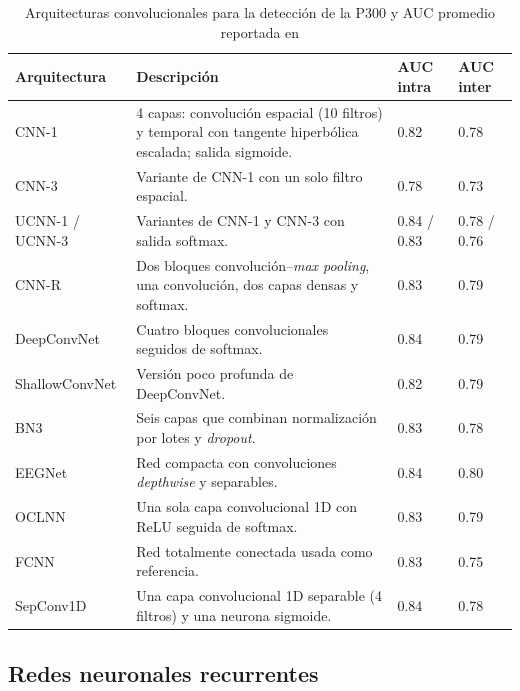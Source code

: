 \begin{table}[htbp]
\centering
\caption{Arquitecturas convolucionales para la detección de la P300 y AUC promedio reportada en
\cite{alvarado2021}}
\label{tab:arquitecturas}
\small
\begin{tabularx}{\textwidth}{L{2.8cm}YL{1.3cm}L{1.3cm}}
\toprule
\textbf{Arquitectura} & \textbf{Descripción} & \textbf{AUC intra} & \textbf{AUC inter} \\
\midrule
CNN-1 \cite{cecotti2011} & 4 capas: convolución espacial (10 filtros) y temporal con tangente hiperbólica escalada; salida sigmoide. & 0.82 & 0.78 \\
CNN-3 \cite{cecotti2011} & Variante de CNN-1 con un solo filtro espacial. & 0.78 & 0.73 \\
UCNN-1 / UCNN-3 \cite{alvarado2021} & Variantes de CNN-1 y CNN-3 con salida softmax. & 0.84 / 0.83 & 0.78 / 0.76 \\
CNN-R \cite{manor2015} & Dos bloques convolución--\textit{max pooling}, una convolución, dos capas densas y softmax. & 0.83 & 0.79 \\
DeepConvNet \cite{schirrmeister2017} & Cuatro bloques convolucionales seguidos de softmax. & 0.84 & 0.79 \\
ShallowConvNet \cite{schirrmeister2017} & Versión poco profunda de DeepConvNet. & 0.82 & 0.79 \\
BN3 \cite{liu2018} & Seis capas que combinan normalización por lotes y \textit{dropout}. & 0.83 & 0.78 \\
EEGNet \cite{lawhern2018} & Red compacta con convoluciones \textit{depthwise} y separables. & 0.84 & 0.80 \\
OCLNN \cite{shan2018} & Una sola capa convolucional 1D con ReLU seguida de softmax. & 0.83 & 0.79 \\
FCNN \cite{alvarado2021} & Red totalmente conectada usada como referencia. & 0.83 & 0.75 \\
SepConv1D \cite{alvarado2021} & Una capa convolucional 1D separable (4 filtros) y una neurona sigmoide. & 0.84 & 0.78 \\
\bottomrule
\end{tabularx}
\par{}
\end{table}

\subsection{Redes neuronales recurrentes}

